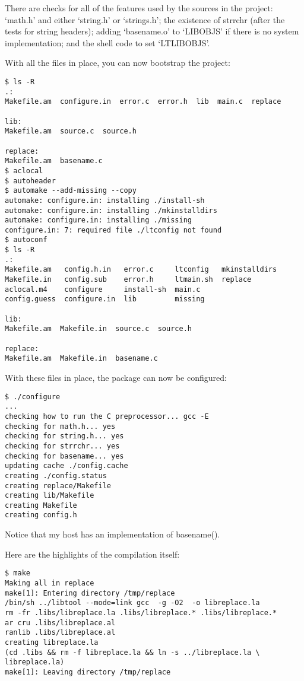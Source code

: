There are checks for all of the features used by the sources in the project: `math.h' and either `string.h' or `strings.h'; the existence of strrchr (after the tests for string headers); adding `basename.o' to `LIBOBJS' if there is no system implementation; and the shell code to set `LTLIBOBJS'. 


With all the files in place, you can now bootstrap the project:

\begin{Verbatim}
$ ls -R
.:
Makefile.am  configure.in  error.c  error.h  lib  main.c  replace

lib:
Makefile.am  source.c  source.h

replace:
Makefile.am  basename.c
$ aclocal
$ autoheader
$ automake --add-missing --copy
automake: configure.in: installing ./install-sh
automake: configure.in: installing ./mkinstalldirs
automake: configure.in: installing ./missing
configure.in: 7: required file ./ltconfig not found
$ autoconf
$ ls -R
.:
Makefile.am   config.h.in   error.c     ltconfig   mkinstalldirs
Makefile.in   config.sub    error.h     ltmain.sh  replace
aclocal.m4    configure     install-sh  main.c     
config.guess  configure.in  lib         missing

lib:
Makefile.am  Makefile.in  source.c  source.h

replace:
Makefile.am  Makefile.in  basename.c
\end{Verbatim}

With these files in place, the package can now be configured:

\begin{verbatim}
$ ./configure
...
checking how to run the C preprocessor... gcc -E
checking for math.h... yes
checking for string.h... yes
checking for strrchr... yes
checking for basename... yes
updating cache ./config.cache
creating ./config.status
creating replace/Makefile
creating lib/Makefile
creating Makefile
creating config.h
\end{verbatim}

Notice that my host has an implementation of basename(). 


Here are the highlights of the compilation itself:

\begin{verbatim}
$ make
Making all in replace
make[1]: Entering directory /tmp/replace
/bin/sh ../libtool --mode=link gcc  -g -O2  -o libreplace.la     
rm -fr .libs/libreplace.la .libs/libreplace.* .libs/libreplace.*
ar cru .libs/libreplace.al
ranlib .libs/libreplace.al
creating libreplace.la
(cd .libs && rm -f libreplace.la && ln -s ../libreplace.la \
libreplace.la)
make[1]: Leaving directory /tmp/replace
\end{verbatim}

